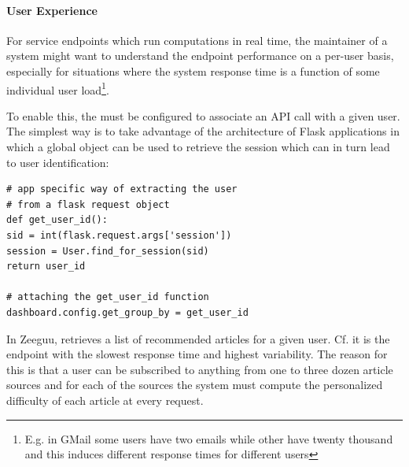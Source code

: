\documentclass{sig-alternate-05-2015}
\begin{document}
\paragraph{User Experience}
\label{sec:user}

For service endpoints which run computations in real time, the maintainer of a system might want to understand the endpoint performance on a per-user basis, especially for situations where the system response time is a function of some individual user load\footnote{E.g. in GMail some users have two emails while other have twenty thousand and this induces different response times for different users}.


To enable this, the \tool must be configured to associate an API call with a given user. The simplest way is to take advantage of the architecture of Flask applications in which a global  object can be used to retrieve the session which can in turn lead to user identification: 

\begin{lstlisting}[style=custompython]  
# app specific way of extracting the user
# from a flask request object    
def get_user_id():
sid = int(flask.request.args['session'])
session = User.find_for_session(sid)
return user_id

# attaching the get_user_id function
dashboard.config.get_group_by = get_user_id

\end{lstlisting}



In Zeeguu, \epFeedItems retrieves a list of recommended articles for a given user. Cf.  it is the endpoint with the slowest response time and highest variability. The reason for this is that a user can be subscribed to anything from one to three dozen article sources and for each of the sources the system must compute the personalized difficulty of each article at every request. 

\end{document}
